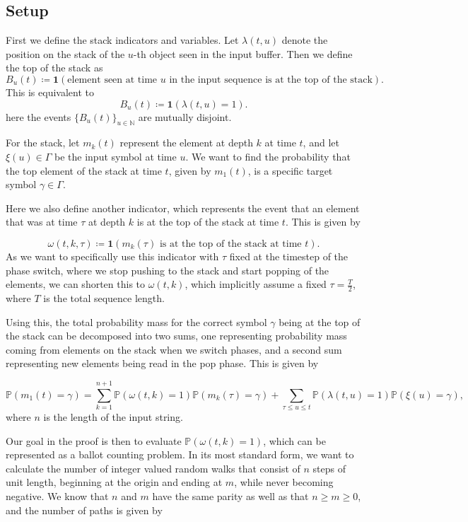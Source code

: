 \documentclass{article}
\begin{document}
\subsection{Setup}

First we define the stack indicators and variables. Let $\lambda(t,u)$ denote the position on the stack of the $u$-th object seen in the input buffer. Then we define the top of the stack as
$$
B_u(t) \coloneqq \mathbf{1}(\text{element seen at time $u$ in the input sequence is at the top of the stack}).
$$
This is equivalent to 
$$
B_u(t) \coloneqq \mathbf{1}(\lambda(t,u) = 1).
$$
here the events $\{B_u(t)\}_{u \in \mathbb{N}}$ are mutually disjoint.

For the stack, let $m_k(t)$ represent the element at depth $k$ at time $t$, and let $\xi(u) \in \Gamma$ be the input symbol at time $u$. We want to find the probability that the top element of the stack at time $t$, given by $m_1(t)$, is a specific target symbol $\gamma \in \Gamma$.

Here we also define another indicator, which represents the event that an element that was at time $\tau$ at depth $k$ is at the top of the stack at time $t$. This is given by

$$
\omega(t,k,\tau) \coloneqq \mathbf{1}(m_k(\tau) \text{ is at the top of the stack at time } t).
$$
As we want to specifically use this indicator with $\tau$ fixed at the timestep of the phase switch, where we stop pushing to the stack and start popping of the elements, we can shorten this to $\omega(t,k)$, which implicitly assume a fixed $\tau = \frac{T}{2}$, where $T$ is the total sequence length. 

Using this, the total probability mass for the correct symbol $\gamma$ being at the top of the stack can be decomposed into two sums, one representing probability mass coming from elements on the stack when we switch phases, and a second sum representing new elements being read in the pop phase. This is given by

$$
\mathbb{P}(m_1(t) = \gamma) = \sum_{k=1}^{n+1}\mathbb{P}(\omega(t,k) = 1)\mathbb{P}(m_k(\tau)=\gamma) + \sum_{\tau \leq u \leq t}\mathbb{P}(\lambda(t,u) = 1)\mathbb{P}(\xi(u) = \gamma),
$$
where $n$ is the length of the input string.

Our goal in the proof is then to evaluate $\mathbb{P}(\omega(t,k) = 1)$, which can be represented as a ballot counting problem. In its most standard form, we want to calculate the number of integer valued random walks that consist of $n$ steps of unit length, beginning at the origin and ending at $m$, while never becoming negative. We know that $n$ and $m$ have the same parity as well as that $n \geq m \geq 0$, and the number of paths is given by
\end{document}
